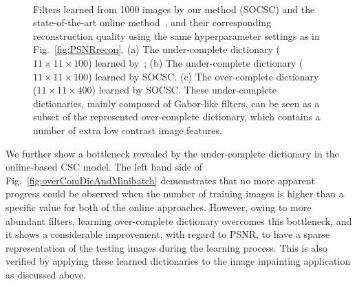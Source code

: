 \begin{figure}[h]
    \\

\caption{Filters learned from 1000 images by our method (SOCSC) and the state-of-the-art online method~\cite{liu-2018-first}, and their corresponding reconstruction quality using the same hyperparameter settings as in Fig.\ \ref{fig:PSNRrecon}. (a) The under-complete dictionary ($11 \times 11 \times 100$) learned by~\cite{liu-2018-first}; (b) The under-complete dictionary ($11 \times 11 \times 100$) learned by SOCSC. (c) The over-complete dictionary ($11 \times 11 \times 400$) learned by SOCSC. These under-complete dictionaries, mainly composed of Gabor-like filters, can be seen as a subset of the represented over-complete dictionary, which contains a number of extra low contrast image features.}
\label{fig:overCompleteDic}
\end{figure}

We further show a bottleneck revealed by the under-complete dictionary in the online-based CSC model. The left hand side of Fig.\ \ref{fig:overComDicAndMinibatch} demonstrates that no more apparent progress could be observed when the number of training images is higher than a specific value for both of the online approaches. However, owing to more abundant filters, learning over-complete dictionary overcomes this bottleneck, and it shows a considerable improvement, with regard to PSNR, to have a sparse representation of the testing images during the learning process. This is also verified by applying these learned dictionaries to the image inpainting application as discussed above.

